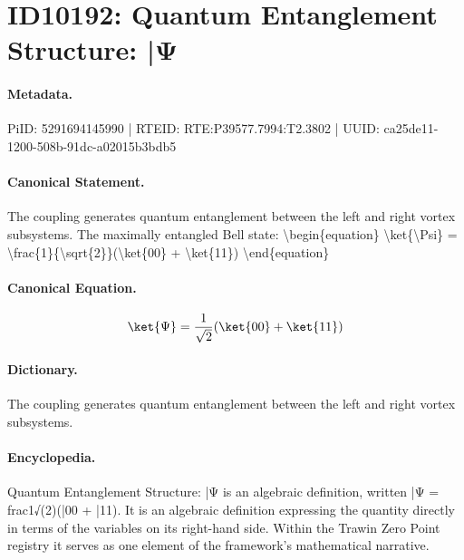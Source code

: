 \section*{ID10192: Quantum Entanglement Structure: |Ψ}
\paragraph{Metadata.}
PiID: 5291694145990 | RTEID: RTE:P39577.7994:T2.3802 | UUID: ca25de11-1200-508b-91dc-a02015b3bdb5

\paragraph{Canonical Statement.}
The coupling generates quantum entanglement between the left and right vortex subsystems. The maximally entangled Bell state: \textbackslash{}begin\{equation\} \textbackslash{}ket\{\textbackslash{}Psi\} = \textbackslash{}frac\{1\}\{\textbackslash{}sqrt\{2\}\}(\textbackslash{}ket\{00\} + \textbackslash{}ket\{11\}) \textbackslash{}end\{equation\}

\paragraph{Canonical Equation.}
\[
\ket{\Psi} = \frac{1}{\sqrt{2}}(\ket{00} + \ket{11})
\]

\paragraph{Dictionary.}
The coupling generates quantum entanglement between the left and right vortex subsystems.

\paragraph{Encyclopedia.}
Quantum Entanglement Structure: |Ψ is an algebraic definition, written |Ψ = frac1√(2)(|00 + |11). It is an algebraic definition expressing the quantity directly in terms of the variables on its right-hand side. Within the Trawin Zero Point registry it serves as one element of the framework's mathematical narrative.
